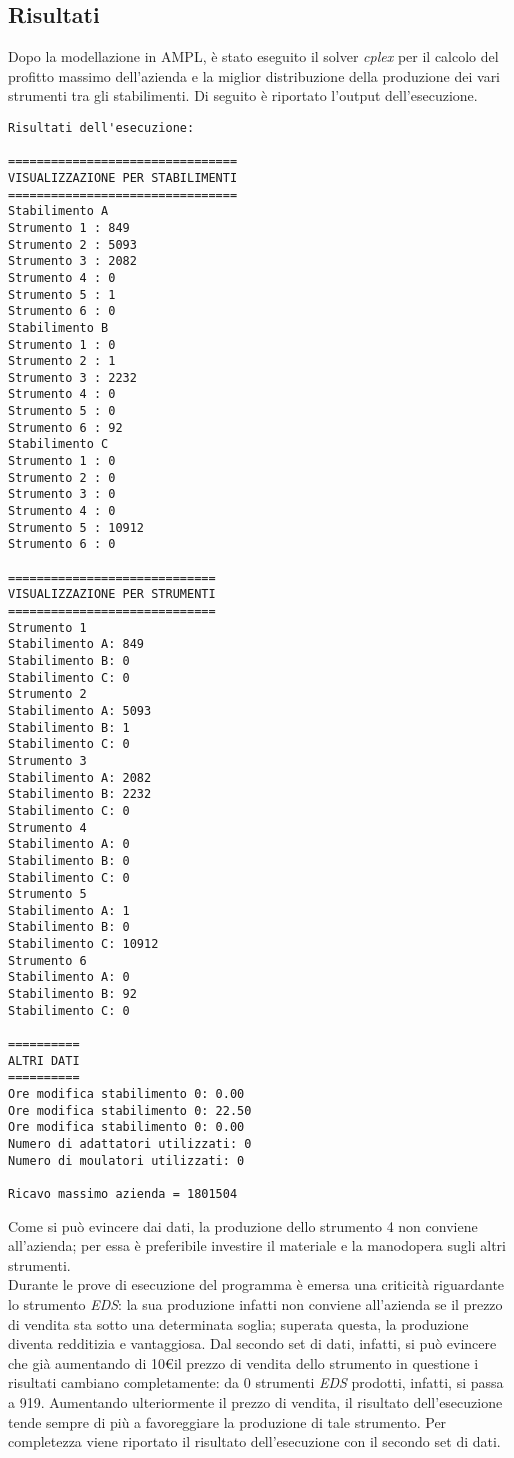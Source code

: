 \subsection{Risultati}
Dopo la modellazione in AMPL, è stato eseguito il solver \textit{cplex} per il calcolo del profitto massimo dell'azienda e la miglior distribuzione della produzione dei vari strumenti tra gli stabilimenti. Di seguito è riportato l'output dell'esecuzione.
\begin{verbatim}
Risultati dell'esecuzione: 
 
================================ 
VISUALIZZAZIONE PER STABILIMENTI 
================================ 
Stabilimento A 
Strumento 1 : 849
Strumento 2 : 5093
Strumento 3 : 2082
Strumento 4 : 0
Strumento 5 : 1
Strumento 6 : 0
Stabilimento B 
Strumento 1 : 0
Strumento 2 : 1
Strumento 3 : 2232
Strumento 4 : 0
Strumento 5 : 0
Strumento 6 : 92
Stabilimento C 
Strumento 1 : 0
Strumento 2 : 0
Strumento 3 : 0
Strumento 4 : 0
Strumento 5 : 10912
Strumento 6 : 0

============================= 
VISUALIZZAZIONE PER STRUMENTI 
============================= 
Strumento 1 
Stabilimento A: 849 
Stabilimento B: 0 
Stabilimento C: 0 
Strumento 2 
Stabilimento A: 5093 
Stabilimento B: 1 
Stabilimento C: 0 
Strumento 3 
Stabilimento A: 2082 
Stabilimento B: 2232 
Stabilimento C: 0 
Strumento 4 
Stabilimento A: 0 
Stabilimento B: 0 
Stabilimento C: 0 
Strumento 5 
Stabilimento A: 1 
Stabilimento B: 0 
Stabilimento C: 10912 
Strumento 6 
Stabilimento A: 0 
Stabilimento B: 92 
Stabilimento C: 0 

========== 
ALTRI DATI 
========== 
Ore modifica stabilimento 0: 0.00 
Ore modifica stabilimento 0: 22.50 
Ore modifica stabilimento 0: 0.00 
Numero di adattatori utilizzati: 0 
Numero di moulatori utilizzati: 0 
 
Ricavo massimo azienda = 1801504 
\end{verbatim}
Come si può evincere dai dati, la produzione dello strumento 4 non conviene all'azienda; per essa è preferibile investire il materiale e la manodopera sugli altri strumenti. \\
Durante le prove di esecuzione del programma è emersa una criticità riguardante lo strumento \textit{EDS}: la sua produzione infatti non conviene all'azienda se il prezzo di vendita sta sotto una determinata soglia; superata questa, la produzione diventa redditizia e vantaggiosa. Dal secondo set di dati, infatti, si può evincere che già aumentando di 10\euro  il prezzo di vendita dello strumento in questione i risultati cambiano completamente: da 0 strumenti \textit{EDS} prodotti, infatti, si passa a 919. Aumentando ulteriormente il prezzo di vendita, il risultato dell'esecuzione tende sempre di più a favoreggiare la produzione di tale strumento. Per completezza viene riportato il risultato dell'esecuzione con il secondo set di dati.
